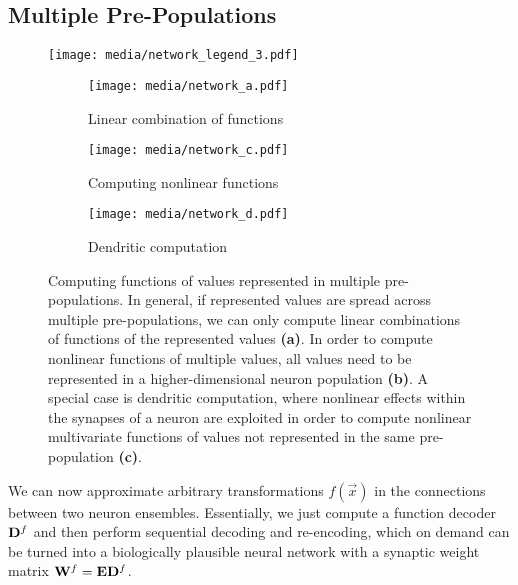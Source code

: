\documentclass[10pt,letterpaper,oneside]{article}
\begin{document}
	\subsection{Multiple Pre-Populations}

	\begin{figure}
		\centering%
		\texttt{[image: media/network\_legend\_3.pdf]}\\
		\begin{subfigure}{0.33\textwidth}%
			\texttt{[image: media/network\_a.pdf]}%
			\caption{Linear combination of functions}
		\end{subfigure}%
		\begin{subfigure}{0.33\textwidth}%
			\texttt{[image: media/network\_c.pdf]}%
			\caption{Computing nonlinear functions}
		\end{subfigure}%
		\begin{subfigure}{0.33\textwidth}%
			\texttt{[image: media/network\_d.pdf]}%
			\caption{Dendritic computation}
		\end{subfigure}%
		\caption{Computing functions of values represented in multiple pre-populations. In general, if represented values are spread across multiple pre-populations, we can only compute linear combinations of functions of the represented values \textbf{(a)}. In order to compute nonlinear functions of multiple values, all values need to be represented in a higher-dimensional neuron population \textbf{(b)}. A special case is dendritic computation, where nonlinear effects within the synapses of a neuron are exploited in order to compute nonlinear multivariate functions of values not represented in the same pre-population \textbf{(c)}.}
		\label{fig:network}
	\end{figure}
	
	We can now approximate arbitrary transformations $f(\vec x)$ in the connections between two neuron ensembles. Essentially, we just compute a function decoder ${\mathbf{D}}^f$ and then perform sequential decoding and re-encoding, which on demand can be turned into a biologically plausible neural network with a synaptic weight matrix ${\mathbf{W}}^f = {\mathbf{E}} {\mathbf{D}}^f$.
\end{document}
